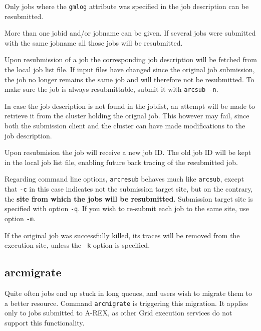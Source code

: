\begin{framed}
   Only jobs where the \verb#gmlog# attribute was
   specified in the job description can be resubmitted.
\end{framed}

More  than  one  jobid and/or jobname can be given. If several
jobs were submitted with the same jobname all those jobs will be resubmitted.

Upon resubmission of a job the corresponding job description will be
fetched from the local job list file. If input files have changed since the
original job submission, the job no longer remains the same job
and will therefore not be resubmitted. To make sure the job is always resubmittable,
submit it with \verb#arcsub -n#.

In case the job description is not found in the joblist, an attempt will be made to
retrieve it from the cluster holding the orignal job.  This however
may fail, since both the submission client and
the cluster can have made modifications to the job description.

Upon resubmision the job will receive a new job ID. The old job ID will be kept
in the local job list file, enabling future back tracing of the resubmitted job.

Regarding command line options, \verb#arcresub# behaves much like \verb#arcsub#, except that
\verb#-c# in this case indicates not the submission target site, but on the contrary, the \textbf{site
from which the jobs will be resubmitted}. Submission target site is specified with
option \verb#-q#. If you wish to re-submit each job to the same site, use option \verb#-m#.

If the original job was successfully killed, its traces will be removed from the execution site,
unless the \verb#-k# option is specified.


\subsection{arcmigrate}
\label{sec:arcmigrate}

Quite often jobs end up stuck in long queues, and users wish to migrate them to a better
resource. Command \texttt{arcmigrate} is
triggering this migration. It applies only to jobs submitted to A-REX, as other Grid
execution services do not support this functionality.


